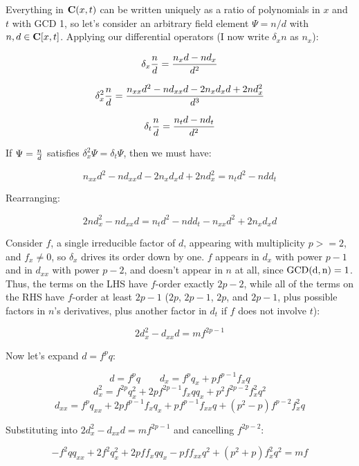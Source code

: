 \documentclass{article}
\newcommand{\C}{\ensuremath{{\bf C}}}
\newcommand{\GCD}{\ensuremath{\rm{GCD}}}
\begin{document}
Everything in ${\bf C}(x,t)$ can be written uniquely as a ratio of
polynomials in $x$ and $t$ with GCD 1, so let's consider an arbitrary
field element $\Psi = n/d$ with $n,d\in\C[x,t]$.  Applying our
differential operators (I now write $\delta_x n$ as $n_x$):

$$\delta_x {n \over d} = {{n_x d - n d_x}\over{d^2}}$$

$$\delta_x^2 {n \over d} = {{n_{xx} d^2 - n d_{xx} d - 2 n_{x}d_{x}d + 2nd_x^2}\over{d^3}}$$

$$\delta_t {n \over d} = {{n_t d - n d_t}\over{d^2}}$$

If $\Psi = {n \over d}$ satisfies $\delta_x^2 \Psi = \delta_t \Psi$, then we must have:

$$n_{xx} d^2 - n d_{xx} d - 2 n_{x}d_{x}d + 2nd_x^2 = n_t d^2 - n d d_t$$

Rearranging:

$$2nd_x^2 - n d_{xx} d = n_t d^2 - n d d_t - n_{xx} d^2 + 2 n_{x}d_{x}d$$

\begin{comment}
Notice that $d$ divides everything on the RHS, so it must also divide the LHS.
We know $\GCD(n,d)=1$, by hypothesis, and we just concluded that
$d$ can't divide $d_x$, so it can't divide the LHS.  Contradiction.
\end{comment}

Consider $f$, a single irreducible factor of $d$,
appearing with multiplicity $p >= 2$, and $f_x \ne 0$, so $\delta_x$ drives
its order down by one.  $f$ appears in $d_x$ with power $p-1$ and in
$d_{xx}$ with power $p-2$, and doesn't appear in $n$ at all, since
$\GCD(d,n)=1$.  Thus, the terms on the LHS have $f$-order exactly
$2p-2$, while all of the terms on the RHS have $f$-order at least
$2p-1$ ($2p$, $2p-1$, $2p$, and $2p-1$, plus possible factors in $n$'s
derivatives, plus another factor in $d_t$ if $f$ does not
involve $t$):

$$2d_x^2 - d_{xx} d = m f^{2p-1}$$

Now let's expand $d=f^pq$:

$$d = f^p q \qquad d_x = f^{p}q_x +pf^{p -1}f_xq$$
$$d_x^2 = f^{2p}q_x^{2} +2pf^{2p -1}f_xqq_x +p^{2}f^{2p -2}f_x^{2}q^{2}$$
$$d_{xx} = f^{p}q_{xx} +2pf^{p -1}f_xq_x +pf^{p -1}f_{xx}q +(p^{2} -p)f^{p -2}f_x^{2}q$$

Substituting into $2d_x^2 - d_{xx} d = m f^{2p-1}$ and cancelling $f^{2p-2}$:

$$-f^{2}qq_{xx} +2f^{2}q_x^{2} +2pff_xqq_x -pff_{xx}q^{2} +(p^{2} +p)f_x^{2}q^{2} = m f$$
\end{document}
